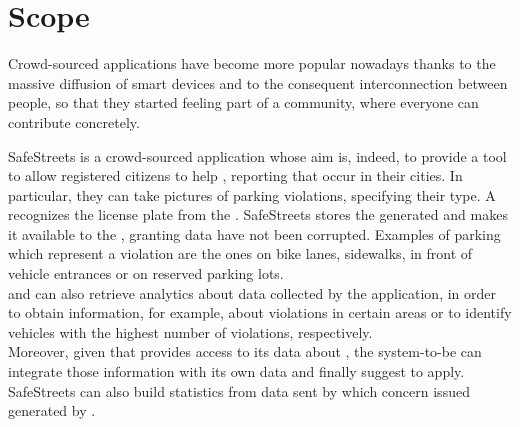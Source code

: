 \documentclass[../../DD.tex]{subfiles}
\begin{document}
\section{Scope\label{sect:1.2}}
	
Crowd-sourced applications have become more popular nowadays thanks to the massive diffusion of smart devices and to the consequent interconnection between people, so that they started feeling part of a community, where everyone can contribute concretely.\newline

SafeStreets is a crowd-sourced application whose aim is, indeed, to provide a tool to allow registered citizens to help , reporting  that occur in their cities. In particular, they can take pictures of parking violations, specifying their type. A  recognizes the license plate from the . SafeStreets stores the generated  and makes it available to the , granting data have not been corrupted. Examples of parking which represent a violation are the ones on bike lanes, sidewalks, in front of vehicle entrances or on reserved parking lots.\\
 and  can also retrieve analytics about data collected by the application, in order to obtain  information, for example, about violations in certain areas or to identify vehicles with the highest number of violations, respectively.\\

Moreover, given that  provides access to its data about , the system-to-be can integrate those information with its own data and finally suggest   to apply.\\
SafeStreets can also build statistics from data sent by  which concern issued  generated by .
\end{document}
